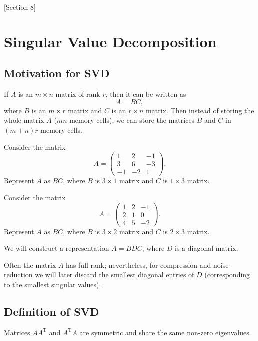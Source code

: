 [Section 8]

\newpage

\section{Singular Value Decomposition}

\subsection{Motivation for SVD}

If $A$ is an $m \times n$ matrix of rank $r$, then it can be written as
$$
A = B C,
$$
where $B$ is an $m \times r$ matrix and  $C$ is an $r \times n$ matrix. Then instead of storing the whole matrix $A$ ($mn$ memory cells), we can store the matrices $B$ and $C$ in $(m+n)r$ memory cells.

\begin{exercise}
Consider the matrix
$$
A = \begin{pmatrix}
1 & 2 & -1 \\
3 & 6 & -3 \\
-1 & -2 & 1
\end{pmatrix}.
$$
Represent $A$ as $B C$, where $B$ is $3\times 1$ matrix and $C$ is $1\times 3$ matrix.
\end{exercise}

\begin{exercise}
Consider the matrix
$$
A = \begin{pmatrix}
1 & 2 & -1 \\
2 & 1 & 0 \\
4 & 5 & -2
\end{pmatrix}.
$$
Represent $A$ as $B C$, where $B$ is $3\times 2$ matrix and $C$ is $2\times 3$ matrix.
\end{exercise}

We will construct a representation $A = B D C$, where $D$ is a diagonal matrix.

Often the matrix $A$ has full rank; nevertheless, for compression and noise reduction we will later discard the smallest diagonal entries of $D$ (corresponding to the smallest singular values).

\subsection{Definition of SVD}

\begin{lemma}
Matrices $A A^{\mathrm T}$ and $A^{\mathrm T} A$ are symmetric and share the same non-zero eigenvalues.
\end{lemma}

